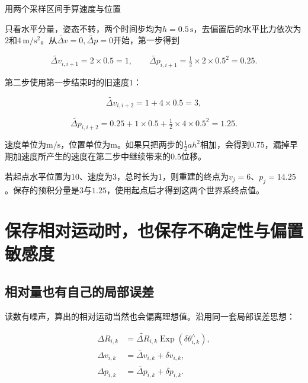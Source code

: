 \begin{bookexample}{用两个采样区间手算速度与位置}

只看水平分量，姿态不转，两个时间步均为$h=0.5\,\mathrm s$，去偏置后的水平比力依次为$2$和$4\,\mathrm{m/s^2}$。从$\widetilde{\Delta v}=0,\widetilde{\Delta p}=0$开始，第一步得到

\begin{equation*}
\widetilde{\Delta v}_{i,i+1}=2\times0.5=1,\qquad
 \widetilde{\Delta p}_{i,i+1}=\tfrac12\times2\times0.5^2=0.25.
\end{equation*}

第二步使用第一步结束时的旧速度$1$：

\begin{equation*}
\widetilde{\Delta v}_{i,i+2}=1+4\times0.5=3,
\end{equation*}

\begin{equation*}
\widetilde{\Delta p}_{i,i+2}
 =0.25+1\times0.5+\tfrac12\times4\times0.5^2=1.25.
\end{equation*}

速度单位为$\mathrm{m/s}$，位置单位为$\mathrm m$。如果只把两步的$\tfrac12ah^2$相加，会得到$0.75$，漏掉早期加速度所产生的速度在第二步中继续带来的$0.5$位移。

若起点水平位置为$10$、速度为$3$，总时长为$1$，则重建的终点为$v_j=6$、$p_j=14.25$。保存的预积分量是$3$与$1.25$，使用起点后才得到这两个世界系终点值。

\end{bookexample}

\section{保存相对运动时，也保存不确定性与偏置敏感度}

\subsection{相对量也有自己的局部误差}

读数有噪声，算出的相对运动当然也会偏离理想值。沿用同一套局部误差思想：

\begin{equation*}
\begin{aligned}
 \Delta R_{i,k}&=\widetilde{\Delta R}_{i,k}\mathop{\mathrm{Exp}}(\delta\theta_{i,k}^\wedge),\\
 \Delta v_{i,k}&=\widetilde{\Delta v}_{i,k}+\delta v_{i,k},\\
 \Delta p_{i,k}&=\widetilde{\Delta p}_{i,k}+\delta p_{i,k}.
\end{aligned}
\end{equation*}

